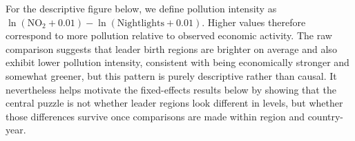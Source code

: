 \documentclass[11pt]{article}
\begin{document}
\begin{table}[h]
\centering
\caption{Sample composition and treatment support across analysis panels}
\label{tab:sample-support}
\small
{}
\end{table}

For the descriptive figure below, we define pollution intensity as $\ln(\text{NO}_2+0.01)-\ln(\text{Nightlights}+0.01)$. Higher values therefore correspond to more pollution relative to observed economic activity. The raw comparison suggests that leader birth regions are brighter on average and also exhibit lower pollution intensity, consistent with being economically stronger and somewhat greener, but this pattern is purely descriptive rather than causal. It nevertheless helps motivate the fixed-effects results below by showing that the central puzzle is not whether leader regions look different in levels, but whether those differences survive once comparisons are made within region and country-year.
\end{document}
